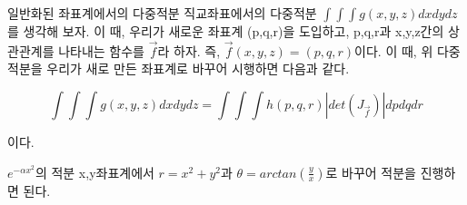 \documentclass{beamer}
\begin{document}
\begin{frame}{일반화된 좌표계에서의 다중적분 } 
직교좌표에서의 다중적분 $\int \int \int g(x,y,z) dx dy dz$를 생각해 보자. 이 때, 우리가 새로운 좌표계 (p,q,r)을 도입하고, p,q,r과 x,y,z간의 상관관계를 나타내는 함수를 $\vec{f}$라 하자. 즉, $\vec{f}(x,y,z) = (p,q,r)$이다. 이 때, 위 다중적분을 우리가 새로 만든 좌표계로 바꾸어 시행하면 다음과 같다. 

\begin{equation} 
\int \int \int g(x,y,z) dx dy dz = \int \int \int h(p,q,r) |det(J_{\vec{f}})| dp dq dr 
\end{equation} 

이다. 
\end{frame}

\begin{frame}{$e^{-\alpha x^2}$의 적분} 
x,y좌표계에서 $r = x^2 + y^2$과 $\theta = arctan(\frac{y}{x})$로 바꾸어 적분을 진행하면 된다. 
\end{frame}










\end{document}
